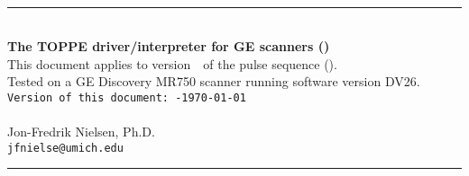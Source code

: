 

\begin{titlepage}
~\\[0.5in]
\begin{centering}
\rule{\textwidth}{5pt}
~\\[0.5in]
{\bf \huge The TOPPE driver/interpreter for GE scanners (\toppe)} \\ [0.6in]
{This document applies to version~\toppeversion~of the pulse sequence (\toppe).   } \\ [0.1in]
{Tested on a GE Discovery MR750 scanner running software version DV26.   } \\ [0.3in]
{\tt Version of this document:~\toppeversion-\today} \\ [0.3in]
{\toppeweb} \\ [0.5in]
{Jon-Fredrik Nielsen, Ph.D.} \\
{\tt jfnielse@umich.edu} \\ [0.5in]
\rule{\textwidth}{5pt}
\end{centering}
\end{titlepage}



